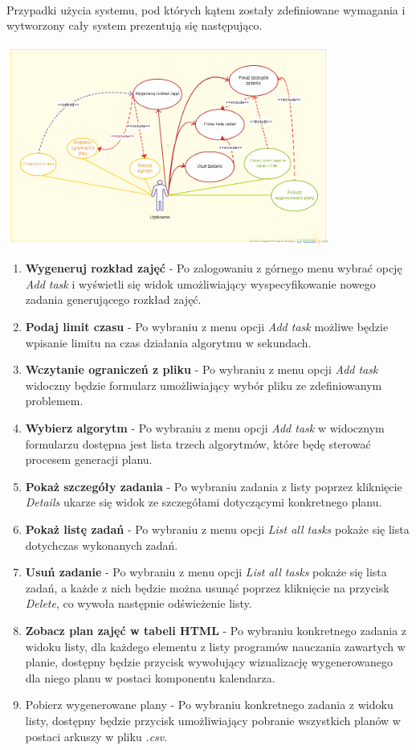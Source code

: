 \paragraph{}Przypadki użycia systemu, pod których kątem zostały zdefiniowane wymagania i wytworzony cały system prezentują się następująco.
\begin{center}
\includegraphics[width=0.8\textwidth]{img/InzynierkaUseCase.png}
\end{center}
\begin{enumerate}
\item \textbf{Wygeneruj rozkład zajęć} - Po zalogowaniu z górnego menu wybrać opcję \emph{Add task} i wyświetli się widok umożliwiający wyspecyfikowanie nowego zadania generującego rozkład zajęć.
\item \textbf{Podaj limit czasu} - Po wybraniu z menu opcji \emph{Add task} możliwe będzie wpisanie limitu na czas działania algorytmu w sekundach.
\item \textbf{Wczytanie ograniczeń z pliku} - Po wybraniu z menu opcji \emph{Add task} widoczny będzie formularz umożliwiający wybór pliku ze zdefiniowanym problemem.
\item \textbf{Wybierz algorytm} - Po wybraniu z menu opcji \emph{Add task} w widocznym formularzu dostępna jest lista trzech algorytmów, które będę sterować procesem generacji planu.
\item \textbf{Pokaż szczegóły zadania} - Po wybraniu zadania z listy poprzez kliknięcie \emph{Details} ukarze się widok ze szczegółami dotyczącymi konkretnego planu.
\item \textbf{Pokaż listę zadań} - Po wybraniu z menu opcji \emph{List all tasks} pokaże się lista dotychczas wykonanych zadań.
\item \textbf{Usuń zadanie} - Po wybraniu z menu opcji \emph{List all tasks} pokaże się lista zadań, a każde z nich będzie można usunąć poprzez kliknięcie na przycisk \emph{Delete}, co wywoła następnie odświeżenie listy.
\item \textbf{Zobacz plan zajęć w tabeli HTML} - Po wybraniu konkretnego zadania z widoku listy, dla każdego elementu z listy programów nauczania zawartych w planie, dostępny będzie przycisk wywołujący wizualizację wygenerowanego dla niego planu w postaci komponentu kalendarza.
\item{Pobierz wygenerowane plany} - Po wybraniu konkretnego zadania z widoku listy, dostępny będzie przycisk umożliwiający pobranie wszystkich planów w postaci arkuszy w pliku \emph{.csv}.
\end{enumerate}
